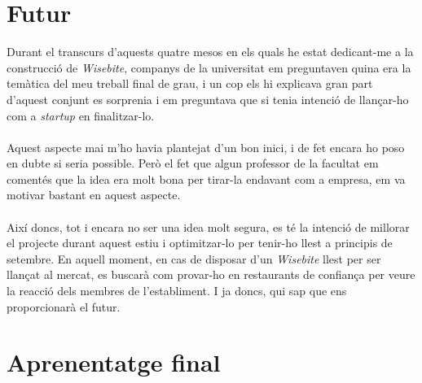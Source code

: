 
\section{Futur}

Durant el transcurs d'aquests quatre mesos en els quals he estat dedicant-me a la construcció de \textit{Wisebite}, companys de la universitat em preguntaven quina era la temàtica del meu treball final de grau, i un cop els hi explicava gran part d'aquest conjunt es sorprenia i em preguntava que si tenia intenció de llançar-ho com a \textit{startup} en finalitzar-lo.
\\\\
Aquest aspecte mai m'ho havia plantejat d'un bon inici, i de fet encara ho poso en dubte si seria possible. Però el fet que algun professor de la facultat em comentés que la idea era molt bona per tirar-la endavant com a empresa, em va motivar bastant en aquest aspecte.
\\\\
Així doncs, tot i encara no ser una idea molt segura, es té la intenció de millorar el projecte durant aquest estiu i optimitzar-lo per tenir-ho llest a principis de setembre. En aquell moment, en cas de disposar d'un \textit{Wisebite} llest per ser llançat al mercat, es buscarà com provar-ho en restaurants de confiança per veure la reacció dels membres de l'establiment. I ja doncs, qui sap que ens proporcionarà el futur.


\section{Aprenentatge final}

